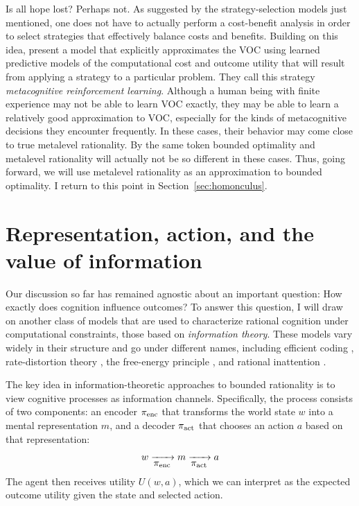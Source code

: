 
Is all hope lost? Perhaps not. As suggested by the strategy-selection models just mentioned, one does not have to actually perform a cost-benefit analysis in order to select strategies that effectively balance costs and benefits. Building on this idea, \citet{lieder2017strategy} present a model that explicitly approximates the VOC using learned predictive models of the computational cost and outcome utility that will result from applying a strategy to a particular problem. They call this strategy \emph{metacognitive reinforcement learning}. Although a human being with finite experience may not be able to learn VOC exactly, they may be able to learn a relatively good approximation to VOC, especially for the kinds of metacognitive decisions they encounter frequently. In these cases, their behavior may come close to true metalevel rationality. By the same token bounded optimality and metalevel rationality will actually not be so different in these cases. Thus, going forward, we will use metalevel rationality as an approximation to bounded optimality. I return to this point in Section~\ref{sec:homonculus}.
 
\section{Representation, action, and the value of information}\label{sec:intro-info}

Our discussion so far has remained agnostic about an important question: How exactly does cognition influence outcomes? To answer this question, I will draw on another class of models that are used to characterize rational cognition under computational constraints, those based on \emph{information theory}. These models vary widely in their structure and go under different names, including efficient coding \citep{barlow1961possible,stocker2006noise}, rate-distortion theory \citep{sims2016rate}, the free-energy principle \citep{friston2010freeenergy}, and rational inattention \citep{sims1998stickiness,caplin2013behavioral}.

The key idea in information-theoretic approaches to bounded rationality is to view cognitive processes as information channels. Specifically, the process consists of two components: an encoder $\pi_{\text{enc}}$ that transforms the world state $w$ into a mental representation $m$, and a decoder $\pi_{\text{act}}$ that chooses an action $a$ based on that representation:
\begin{equation}
  w \xrightarrow[{\displaystyle \pi_{\text{enc}}}]{} m 
    \xrightarrow[{\displaystyle \pi_{\text{act}}}]{} a
\end{equation}
The agent then receives utility $U(w, a)$, which we can interpret as the expected outcome utility given the state and selected action.

